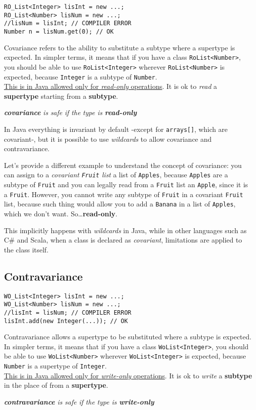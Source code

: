 \begin{lstlisting}
RO_List<Integer> lisInt = new ...;
RO_List<Number> lisNum = new ...;
//lisNum = lisInt; // COMPILER ERROR
Number n = lisNum.get(0); // OK
\end{lstlisting}
Covariance refers to the ability to substitute a subtype where a supertype is expected. In simpler terms, it means that if you have a class \lstinline|RoList<Number>|, you should be able to use \lstinline|RoList<Integer>| wherever \lstinline|RoList<Number>| is expected, because \lstinline|Integer| is a subtype of \lstinline|Number|.\\
\ul{This is in Java allowed only for \textit{read-only} operations}.
It is ok to \textit{read} a \textbf{supertype} starting from a \textbf{subtype}.
\begin{center}
   \textit{\textbf{covariance} is safe if the type is \textbf{read-only}}
\end{center}

In Java everything is invariant by default -except for \lstinline|arrays[]|, which are covariant-, but it is possible to use \textit{wildcards} to allow covariance and contravariance.

Let's provide a different example to understand the concept of covariance:
you can assign to a \textit{covariant \texttt{Fruit} list} a list of \texttt{Apples}, because \texttt{Apples} are a subtype of \texttt{Fruit} and you can legally read from a \texttt{Fruit} list an \texttt{Apple}, since it is a \texttt{Fruit}.
However, you cannot write any subtype of \texttt{Fruit} in a covariant \texttt{Fruit} list, because such thing would allow you to add a \texttt{Banana} in a list of \texttt{Apples}, which we don't want. So\dots \textbf{read-only}.

This implicitly happens with \textit{wildcards} in Java, while in other languages such as C\# and Scala, when a class is declared as \textit{covariant}, limitations are applied to the class itself.

\subsection{Contravariance}
\begin{lstlisting}
WO_List<Integer> lisInt = new ...;
WO_List<Number> lisNum = new ...;
//lisInt = lisNum; // COMPILER ERROR
lisInt.add(new Integer(...)); // OK
\end{lstlisting}
Contravariance allows a supertype to be substituted where a subtype is expected. In simpler terms, it means that if you have a class \lstinline|WoList<Integer>|, you should be able to use \lstinline|WoList<Number>| wherever \lstinline|WoList<Integer>| is expected, because \lstinline|Number| is a supertype of \lstinline|Integer|.\\
\ul{This is in Java allowed only for \textit{write-only} operations}.
It is ok to \textit{write} a \textbf{subtype} in the place of from a \textbf{supertype}.
\begin{center}
   \textit{\textbf{contravariance} is safe if the type is \textbf{write-only}}
\end{center}

